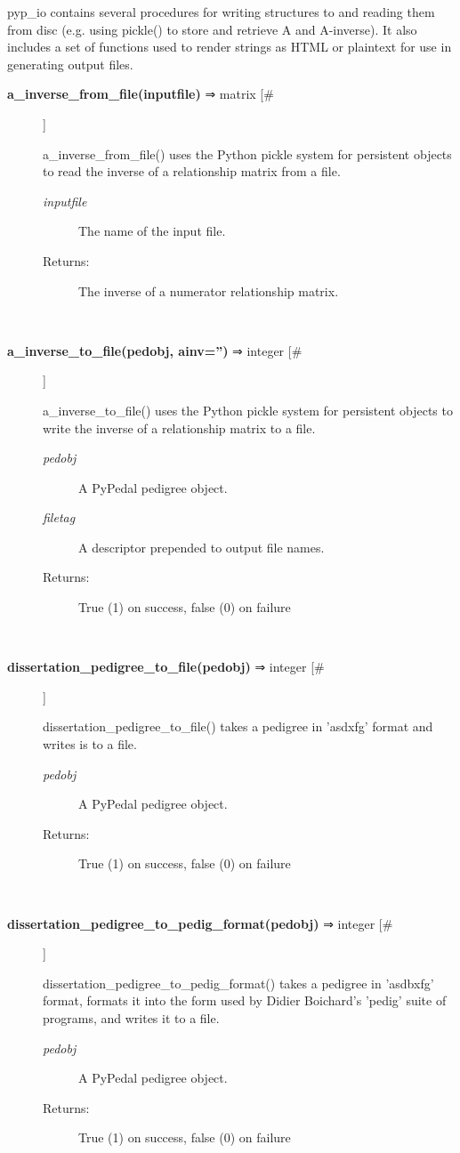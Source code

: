 \par pyp\_io contains several procedures for writing structures to and reading them from
disc (e.g. using pickle() to store and retrieve A and A-inverse).  It also includes a set
of functions used to render strings as HTML or plaintext for use in generating output
files.
\begin{description}
\item[\textbf{a\_inverse\_from\_file(inputfile)} ⇒ matrix [\#]
]
\par a\_inverse\_from\_file() uses the Python pickle system for persistent objects to read the inverse of
a relationship matrix from a file.
\begin{description}
\item[\textit{inputfile}
]
The name of the input file.
\item[Returns:
]
The inverse of a numerator relationship matrix.
\end{description}\\

\item[\textbf{a\_inverse\_to\_file(pedobj, ainv='')} ⇒ integer [\#]
]
\par a\_inverse\_to\_file() uses the Python pickle system for persistent objects to write the
inverse of a relationship matrix to a file.
\begin{description}
\item[\textit{pedobj}
]
A PyPedal pedigree object.
\item[\textit{filetag}
]
A descriptor prepended to output file names.
\item[Returns:
]
True (1) on success, false (0) on failure
\end{description}\\

\item[\textbf{dissertation\_pedigree\_to\_file(pedobj)} ⇒ integer [\#]
]
\par dissertation\_pedigree\_to\_file() takes a pedigree in 'asdxfg' format and writes is to a file.
\begin{description}
\item[\textit{pedobj}
]
A PyPedal pedigree object.
\item[Returns:
]
True (1) on success, false (0) on failure
\end{description}\\

\item[\textbf{dissertation\_pedigree\_to\_pedig\_format(pedobj)} ⇒ integer [\#]
]
\par dissertation\_pedigree\_to\_pedig\_format() takes a pedigree in 'asdbxfg' format, formats it into
the form used by Didier Boichard's 'pedig' suite of programs, and writes it to a file.
\begin{description}
\item[\textit{pedobj}
]
A PyPedal pedigree object.
\item[Returns:
]
True (1) on success, false (0) on failure
\end{description}\\


\end{description}
